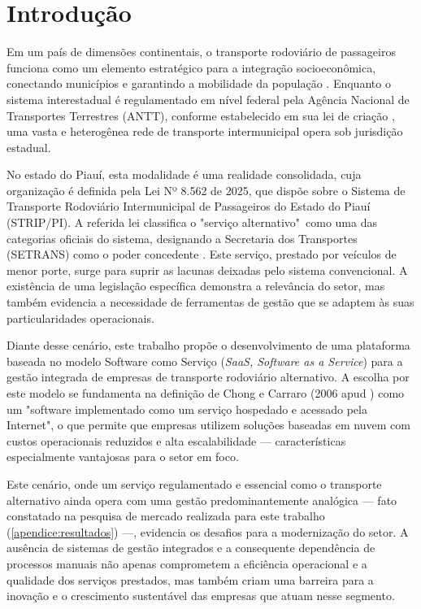 \chapter{Introdução}\label{cha:introducao}

Em um país de dimensões continentais, o transporte rodoviário de passageiros funciona como um elemento estratégico para a integração socioeconômica, conectando municípios e garantindo a mobilidade da população \cite{FGV2023}. Enquanto o sistema interestadual é regulamentado em nível federal pela Agência Nacional de Transportes Terrestres (ANTT), conforme estabelecido em sua lei de criação \cite{BRASIL2001}, uma vasta e heterogênea rede de transporte intermunicipal opera sob jurisdição estadual.

No estado do Piauí, esta modalidade é uma realidade consolidada, cuja organização é definida pela Lei Nº 8.562 de 2025, que dispõe sobre o Sistema de Transporte Rodoviário Intermunicipal de Passageiros do Estado do Piauí (STRIP/PI). A referida lei classifica o "serviço alternativo"\ como uma das categorias oficiais do sistema, designando a Secretaria dos Transportes (SETRANS) como o poder concedente \cite{PIAUI2025}. Este serviço, prestado por veículos de menor porte, surge para suprir as lacunas deixadas pelo sistema convencional. A existência de uma legislação específica demonstra a relevância do setor, mas também evidencia a necessidade de ferramentas de gestão que se adaptem às suas particularidades operacionais.

Diante desse cenário, este trabalho propõe o desenvolvimento de uma plataforma
baseada no modelo Software como Serviço (\textit{SaaS, Software as a Service})
para a gestão integrada de empresas de transporte rodoviário alternativo.
A escolha por este modelo se fundamenta na definição de Chong e Carraro
(2006 apud \textcite{melo2007software}) como um "software implementado
como um serviço hospedado e acessado pela Internet", o que permite que empresas
utilizem soluções baseadas em nuvem com custos operacionais reduzidos e alta
escalabilidade --- características especialmente vantajosas para o setor em foco.

Este cenário, onde um serviço regulamentado e essencial como o transporte alternativo ainda opera com uma gestão predominantemente analógica — fato constatado na pesquisa de mercado realizada para este trabalho (\autoref{apendice:resultados}) —, evidencia os desafios para a modernização do setor. A ausência de sistemas de gestão integrados e a consequente dependência de processos manuais não apenas comprometem a eficiência operacional e a qualidade dos serviços prestados, mas também criam uma barreira para a inovação e o crescimento sustentável das empresas que atuam nesse segmento.

